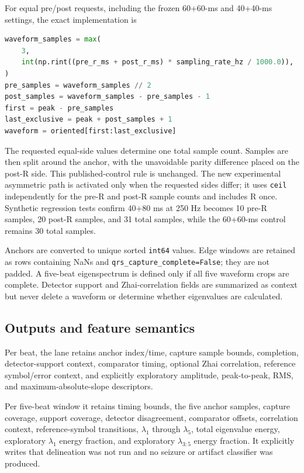 \documentclass[11pt,a4paper]{article}
\begin{document}
For equal pre/post requests, including the frozen 60+60-ms and 40+40-ms
settings, the exact implementation is
\begin{lstlisting}[language=Python]
waveform_samples = max(
    3,
    int(np.rint((pre_r_ms + post_r_ms) * sampling_rate_hz / 1000.0)),
)
pre_samples = waveform_samples // 2
post_samples = waveform_samples - pre_samples - 1
first = peak - pre_samples
last_exclusive = peak + post_samples + 1
waveform = oriented[first:last_exclusive]
\end{lstlisting}

The requested equal-side values determine one total sample count. Samples are
then split around the anchor, with the unavoidable parity difference placed on
the post-R side. This published-control rule is unchanged. The new experimental
asymmetric path is activated only when the requested sides differ; it uses
\texttt{ceil} independently for the pre-R and post-R sample counts and includes
R once. Synthetic regression tests confirm 40+80 ms at 250 Hz becomes 10
pre-R samples, 20 post-R samples, and 31 total samples, while the 60+60-ms
control remains 30 total samples.

Anchors are converted to unique sorted \texttt{int64} values. Edge windows are retained as rows containing NaNs and \texttt{qrs\_capture\_complete=False}; they are not padded. A five-beat eigenspectrum is defined only if all five waveform crops are complete. Detector support and Zhai-correlation fields are summarized as context but never delete a waveform or determine whether eigenvalues are calculated.

\subsection{Outputs and feature semantics}

Per beat, the lane retains anchor index/time, capture sample bounds, completion, detector-support context, comparator timing, optional Zhai correlation, reference symbol/error context, and explicitly exploratory amplitude, peak-to-peak, RMS, and maximum-absolute-slope descriptors.

Per five-beat window it retains timing bounds, the five anchor samples, capture coverage, support coverage, detector disagreement, comparator offsets, correlation context, reference-symbol transitions, $\lambda_1$ through $\lambda_5$, total eigenvalue energy, exploratory $\lambda_1$ energy fraction, and exploratory $\lambda_{3:5}$ energy fraction. It explicitly writes that delineation was not run and no seizure or artifact classifier was produced.
\end{document}

